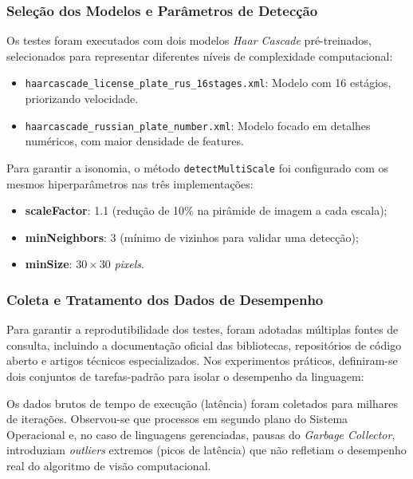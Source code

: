 \subsubsection{Seleção dos Modelos e Parâmetros de Detecção}
Os testes foram executados com dois modelos \textit{Haar Cascade} pré-treinados, selecionados para representar diferentes níveis de complexidade computacional:
\begin{itemize}
    \item \texttt{haarcascade\_license\_plate\_rus\_16stages.xml}\label{mdl:haarcascade_license_plate_rus_16stages}: Modelo com 16 estágios, priorizando velocidade.
    \item \texttt{haarcascade\_russian\_plate\_number.xml}\label{mdl:haarcascade_russian_plate_number}: Modelo focado em detalhes numéricos, com maior densidade de features.
\end{itemize}

Para garantir a isonomia, o método \texttt{detectMultiScale} foi configurado com os mesmos hiperparâmetros nas três implementações:
\begin{itemize}
    \item \textbf{scaleFactor}: 1.1 (redução de 10\% na pirâmide de imagem a cada escala);
    \item \textbf{minNeighbors}: 3 (mínimo de vizinhos para validar uma detecção);
    \item \textbf{minSize}: $30 \times 30$ \textit{pixels}.
\end{itemize}

\subsubsection{Coleta e Tratamento dos Dados de Desempenho}

Para garantir a reprodutibilidade dos testes, foram adotadas múltiplas fontes de consulta, incluindo a documentação oficial das bibliotecas, repositórios de código aberto e artigos técnicos especializados. Nos experimentos práticos, definiram-se dois conjuntos de tarefas-padrão para isolar o desempenho da linguagem:

Os dados brutos de tempo de execução (latência) foram coletados para milhares de iterações. Observou-se que processos em segundo plano do Sistema Operacional e, no caso de linguagens gerenciadas, pausas do \textit{Garbage Collector}, introduziam \textit{outliers} extremos (picos de latência) que não refletiam o desempenho real do algoritmo de visão computacional.


